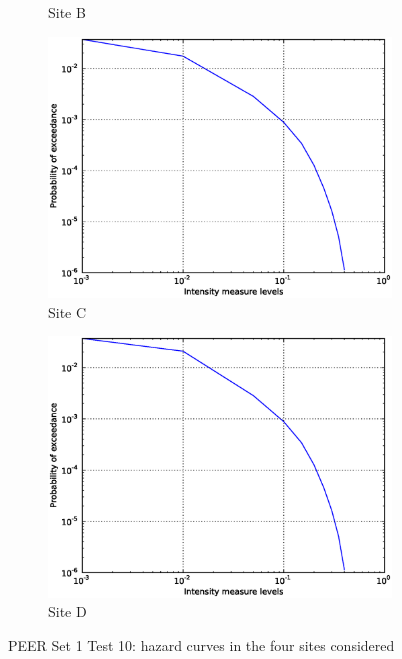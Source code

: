 \begin{figure}[ht]
\begin{subfigure}[t]{0.4\textwidth}
        \caption{Site B}
    \end{subfigure}
    \begin{subfigure}[b]{0.4\textwidth}
        \includegraphics[width=\textwidth]{./figures/peer_set1_test10/003_-122.00_37.55.eps}
        \caption{Site C}
    \end{subfigure}
    \begin{subfigure}[b]{0.4\textwidth}
        \includegraphics[width=\textwidth]{./figures/peer_set1_test10/002_-122.00_38.00.eps}
        \caption{Site D}
    \end{subfigure}
\caption{PEER Set 1 Test 10: hazard curves in the four sites considered}
\label{fig:demo_peer_set1_test10_hc}
\end{figure}
\clearpage
